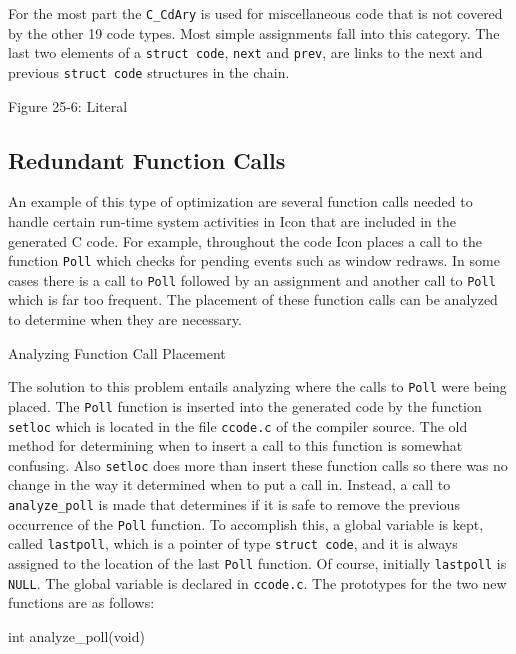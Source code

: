For the most part the \texttt{C\_CdAry} is used for miscellaneous code
that is not covered by the other 19 code types. Most simple
assignments fall into this category. The last two elements of a
\texttt{struct code}, \texttt{next} and \texttt{prev}, are links to
the next and previous \texttt{struct code} structures in the chain.


\bigskip


\bigskip

{\centering{}
Figure 25-6: Literal
\par}

\subsection[Redundant Function Calls]{Redundant Function Calls}

An example of this type of optimization are several function calls
needed to handle certain run-time system activities in Icon that are
included in the generated C code. For example, throughout the code
Icon places a call to the function \texttt{Poll} which checks for
pending events such as window redraws. In some cases there is a call
to \texttt{Poll} followed by an assignment and another call to
\texttt{Poll} which is far too frequent. The placement of these
function calls can be analyzed to determine when they are necessary.

{\sffamily
Analyzing Function Call Placement}


The solution to this problem entails analyzing where the calls to
\texttt{Poll} were being placed. The \texttt{Poll} function is
inserted into the generated code by the function \texttt{setloc} which
is located in the file \texttt{ccode.c} of the compiler source. The
old method for determining when to insert a call to this function is
somewhat confusing. Also \texttt{setloc} does more than insert these
function calls so there was no change in the way it determined when to
put a call in. Instead, a call to \texttt{analyze\_poll} is made that
determines if it is safe to remove the previous occurrence of the
\texttt{Poll} function. To accomplish this, a global variable is kept,
called \texttt{lastpoll}, which is a pointer of type \texttt{struct
code}, and it is always assigned to the location of the last
\texttt{Poll} function. Of course, initially \texttt{lastpoll} is
\texttt{NULL}. The global variable is declared in
\texttt{ccode.c}. The prototypes for the two new functions are as
follows:

{\ttfamily\mdseries
int analyze\_poll(void)}


